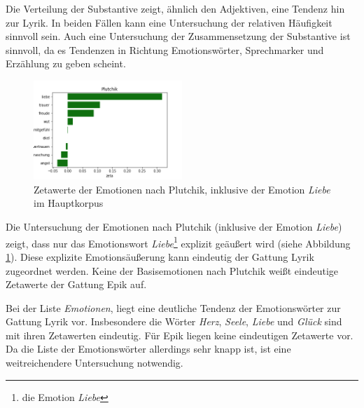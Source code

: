 \documentclass[a4paper,10p]{article}
\begin{document}
Die Verteilung der Substantive zeigt, ähnlich den Adjektiven, eine Tendenz hin zur Lyrik. In beiden Fällen kann eine Untersuchung der relativen Häufigkeit sinnvoll sein. Auch eine Untersuchung der Zusammensetzung der Substantive ist sinnvoll, da es Tendenzen in Richtung Emotionswörter, Sprechmarker und Erzählung zu geben scheint.\par 

\begin{figure}
	\includegraphics[width=0.5\textwidth]{hauptkorpus_prowort_plutchik_kleiner.png}
	\caption{Zetawerte der Emotionen nach Plutchik, inklusive der Emotion \textit{Liebe} im Hauptkorpus}
	\label{fig:haupt_plutchik}
\end{figure}

Die Untersuchung der Emotionen nach Plutchik (inklusive der Emotion \textit{Liebe}) zeigt, dass nur das Emotionswort \textit{Liebe}\footnote{die Emotion \textit{Liebe}} explizit geäußert wird (siehe Abbildung  \ref{fig:haupt_plutchik}). Diese explizite Emotionsäußerung kann eindeutig der Gattung Lyrik zugeordnet werden. Keine der Basisemotionen nach Plutchik weißt eindeutige Zetawerte der Gattung Epik auf. \par 

Bei der Liste \textit{Emotionen}, liegt eine deutliche Tendenz der Emotionswörter zur Gattung Lyrik vor. Insbesondere die Wörter \textit{Herz}, \textit{Seele},  \textit{Liebe} und \textit{Glück} sind mit ihren Zetawerten eindeutig. Für Epik liegen keine eindeutigen Zetawerte vor. Da die Liste der Emotionswörter allerdings sehr knapp ist, ist eine weitreichendere Untersuchung notwendig.  \par 
\end{document}
